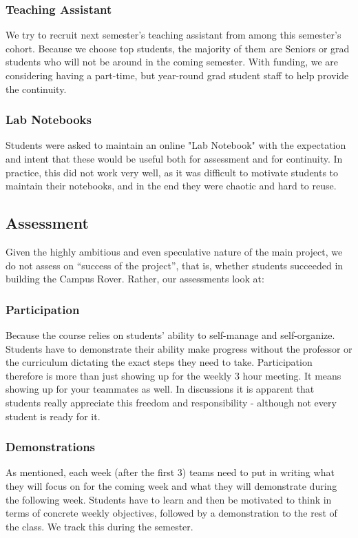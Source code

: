 \subsubsection{Teaching Assistant}We try to recruit next semester’s teaching assistant from among this semester’s cohort. Because we choose top students, the majority of them are Seniors or grad students who will not be around in the coming semester. With funding, we are considering having a part-time, but year-round grad student staff to help provide the continuity.
\subsubsection{Lab Notebooks}Students were asked to maintain an online "Lab Notebook" with the expectation and intent that these would be useful both for assessment and for continuity. In practice, this did not work very well, as it was difficult to motivate students to maintain their notebooks, and in the end they were chaotic and hard to reuse.

\subsection{Assessment} Given the highly ambitious and even speculative nature of the main project, we do not assess on “success of the project”, that is, whether students succeeded in building the Campus Rover. Rather, our assessments look at:

\subsubsection{Participation}Because the course relies on students’ ability to self-manage and self-organize. Students have to demonstrate their ability make progress without the professor or the curriculum dictating the exact steps they need to take. Participation therefore is more than just showing up for the weekly 3 hour meeting. It means showing up for your teammates as well. In discussions it is apparent that students really appreciate this freedom and responsibility - although not every student is ready for it.

\subsubsection{Demonstrations}As mentioned, each week (after the first 3) teams need to put in writing what they will focus on for the coming week and what they will demonstrate during the following week. Students have to learn and then be motivated to think in terms of concrete weekly objectives, followed by a demonstration to the rest of the class. We track this during the semester.

